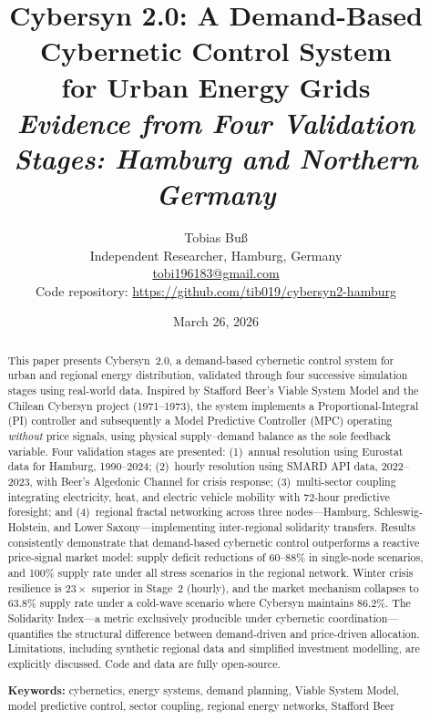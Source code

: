 \documentclass[12pt]{article}
\title{\textbf{Cybersyn 2.0: A Demand-Based Cybernetic Control System\\
for Urban Energy Grids}\\[0.6em]
\large\textit{Evidence from Four Validation Stages: Hamburg and Northern Germany}}
\author{Tobias Bu\ss\\[4pt]
  \small Independent Researcher, Hamburg, Germany\\
  \small \href{mailto:tobi196183@gmail.com}{tobi196183@gmail.com}\\[4pt]
  \small Code repository: \url{https://github.com/tib019/cybersyn2-hamburg}}
\date{March 26, 2026}
\begin{document}
\maketitle

\begin{abstract}
\noindent
This paper presents Cybersyn~2.0, a demand-based cybernetic control system for urban
and regional energy distribution, validated through four successive simulation stages
using real-world data.
Inspired by Stafford Beer's Viable System Model and the Chilean Cybersyn project
(1971--1973), the system implements a Proportional-Integral (PI) controller and
subsequently a Model Predictive Controller (MPC) operating \emph{without} price
signals, using physical supply--demand balance as the sole feedback variable.
Four validation stages are presented: (1)~annual resolution using Eurostat data for
Hamburg, 1990--2024; (2)~hourly resolution using SMARD API data, 2022--2023, with
Beer's Algedonic Channel for crisis response; (3)~multi-sector coupling integrating
electricity, heat, and electric vehicle mobility with 72-hour predictive foresight;
and (4)~regional fractal networking across three nodes---Hamburg, Schleswig-Holstein,
and Lower Saxony---implementing inter-regional solidarity transfers.
Results consistently demonstrate that demand-based cybernetic control outperforms a
reactive price-signal market model: supply deficit reductions of 60--88\% in
single-node scenarios, and 100\% supply rate under all stress scenarios in the
regional network.
Winter crisis resilience is $23\times$ superior in Stage~2 (hourly), and the market
mechanism collapses to 63.8\% supply rate under a cold-wave scenario where Cybersyn
maintains 86.2\%.
The Solidarity Index---a metric exclusively producible under cybernetic
coordination---quantifies the structural difference between demand-driven and
price-driven allocation.
Limitations, including synthetic regional data and simplified investment modelling,
are explicitly discussed.
Code and data are fully open-source.

\medskip\noindent
\textbf{Keywords:} cybernetics, energy systems, demand planning, Viable System Model,
model predictive control, sector coupling, regional energy networks, Stafford Beer
\end{abstract}

\newpage
\tableofcontents
\newpage

\end{document}
